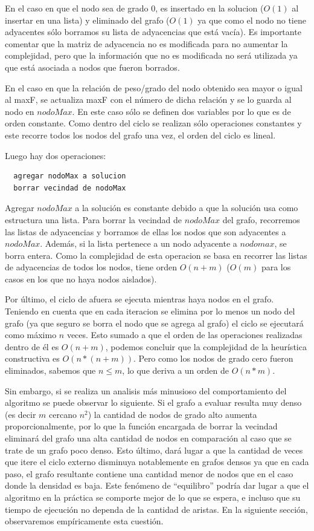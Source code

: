 \documentclass[a4paper,11pt] {article}
\begin{document}
En el caso en que el nodo sea de grado $0$, es insertado en la solucion ($O(1)$ al insertar en una lista) y eliminado del grafo ($O(1)$ ya que como el nodo no tiene adyacentes sólo borramos su lista de adyacencias que está vacía).
Es importante comentar que la matriz de adyacencia no es modificada para no aumentar la complejidad, pero que la información que no es modificada no será utilizada ya que está asociada a nodos que fueron borrados.

En el caso en que la relación de peso/grado del nodo obtenido sea mayor o igual al maxF, se actualiza maxF con el número de dicha relación y se lo guarda al nodo en $nodoMax$. En este caso sólo se definen dos variables por lo que es de orden constante. Como dentro del ciclo se realizan sólo operaciones constantes y este recorre todos los nodos del grafo una vez, el orden del ciclo es lineal.

Luego hay dos operaciones:
\begin{verbatim}
  agregar nodoMax a solucion
  borrar vecindad de nodoMax
\end{verbatim}

Agregar $nodoMax$ a la solución es constante debido a que la solución usa como estructura una lista. Para borrar la vecindad de $nodoMax$ del grafo, recorremos las listas de adyacencias y borramos de ellas los nodos que son adyacentes a $nodoMax$. Además, si la lista pertenece a un nodo adyacente a $nodomax$, se borra entera. Como la complejidad de esta operacion se basa en recorrer las listas de adyacencias de todos los nodos, tiene orden $O(n + m)$ ($O(m)$ para los casos en los que no haya nodos aislados).

Por último, el ciclo de afuera se ejecuta mientras haya nodos en el grafo. Teniendo en cuenta que en cada iteracion se elimina por lo menos un nodo del grafo (ya que seguro se borra el nodo que se agrega al grafo) el ciclo se ejecutará como máximo $n$ veces. Esto sumado a que el orden de las operaciones realizadas dentro de él es $O(n + m)$, podemos concluir que la complejidad de la heurística constructiva es $O(n*(n + m))$. Pero como los nodos de grado cero fueron eliminados, sabemos que $n \leq m$, lo que deriva a un orden de $O(n*m)$.

Sin embargo, si se realiza un analisis más minusioso del comportamiento del algoritmo se puede observar lo siguiente. Si el grafo a evaluar resulta muy denso (es decir $m$ cercano $n^2$) la cantidad de nodos de grado alto aumenta proporcionalmente, por lo que la función encargada de borrar la vecindad eliminará del grafo una alta cantidad de nodos en comparación al caso que se trate de un grafo poco denso. Esto último, dará lugar a que la cantidad de veces que itere el ciclo externo disminuya notablemente en grafos densos ya que en cada paso, el grafo resultante contiene una cantidad menor de nodos que en el caso donde la densidad es baja. Este fenómeno de ``equilibro'' podría dar lugar a que el algoritmo en la práctica se comporte mejor de lo que se espera, e incluso que su tiempo de ejecución no dependa de la cantidad de aristas. En la siguiente sección, observaremos empíricamente esta cuestión.
\end{document}
